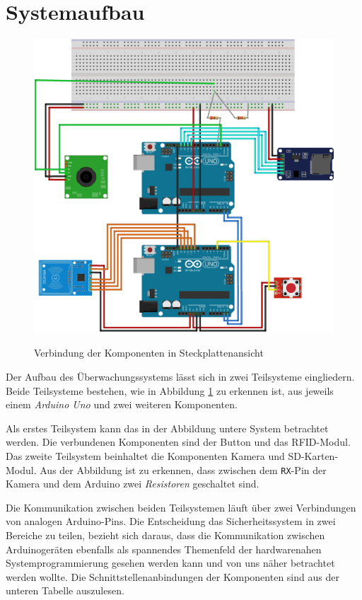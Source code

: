 \documentclass[a4paper, 11pt]{article}
\begin{document}
\section{Systemaufbau}
\begin{figure}[htb]
\centering
    {\includegraphics[width=1\textwidth]{uebersicht.png}}
    \caption{Verbindung der Komponenten in Steckplattenansicht\label{fig:uebersicht}}
\centering
\end{figure}

\noindent Der Aufbau des Überwachungssystems lässt sich in zwei Teilsysteme eingliedern. Beide Teilsysteme bestehen, wie in Abbildung \ref{fig:uebersicht} zu erkennen ist, aus jeweils einem \textit{Arduino Uno} und zwei weiteren Komponenten. 

Als erstes Teilsystem kann das in der Abbildung untere System betrachtet werden. Die verbundenen Komponenten sind der Button und das RFID-Modul.
Das zweite Teilsystem beinhaltet die Komponenten Kamera und SD-Karten-Modul. Aus der Abbildung ist zu erkennen, dass zwischen dem \texttt{RX}-Pin der Kamera und dem Arduino zwei \textit{Resistoren} geschaltet sind.

Die Kommunikation zwischen beiden Teilsystemen läuft über zwei Verbindungen von analogen Arduino-Pins. Die Entscheidung das Sicherheitssystem in zwei Bereiche zu teilen, bezieht sich daraus, dass die Kommunikation zwischen Arduinogeräten ebenfalls als spannendes Themenfeld der hardwarenahen Systemprogrammierung gesehen werden kann und von uns näher betrachtet werden wollte.
Die Schnittstellenanbindungen der Komponenten sind aus der unteren Tabelle auszulesen.
\end{document}
